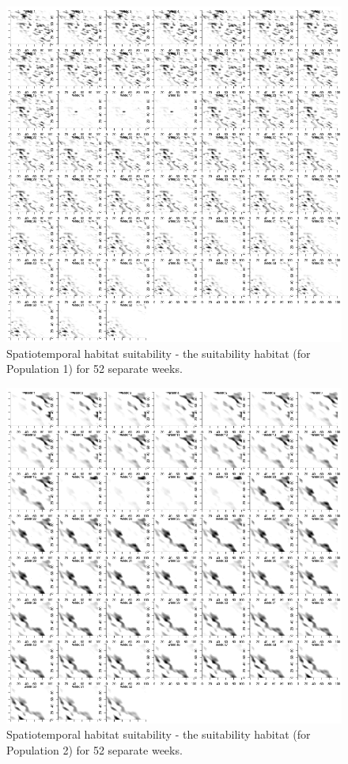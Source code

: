 \documentclass[review]{elsarticle}
\begin{document}
\begin{figure}[!ht]
	\includegraphics[width = \linewidth]{Plots/habitat_spatiotemp_spp_1}
	\caption{Spatiotemporal habitat suitability - the suitability habitat
		(for Population 1) for 52 separate weeks.}
	\label{fig:5}
\end{figure}

\begin{figure}[!ht]
	\includegraphics[width = \linewidth]{Plots/habitat_spatiotemp_spp_2}
	\caption{Spatiotemporal habitat suitability - the suitability habitat
		(for Population 2) for 52 separate weeks.}
	\label{fig:6}
\end{figure}
\end{document}
